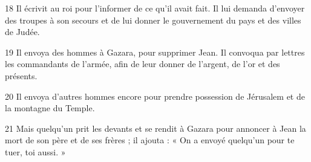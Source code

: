 
18 Il écrivit au roi pour l’informer de ce qu’il avait fait. Il lui demanda d’envoyer des troupes à son secours et de lui donner le gouvernement du pays et des villes de Judée.

19 Il envoya des hommes à Gazara, pour supprimer Jean. Il convoqua par lettres les commandants de l’armée, afin de leur donner de l’argent, de l’or et des présents.

20 Il envoya d’autres hommes encore pour prendre possession de Jérusalem et de la montagne du Temple.

21 Mais quelqu’un prit les devants et se rendit à Gazara pour annoncer à Jean la mort de son père et de ses frères ; il ajouta : « On a envoyé quelqu’un pour te tuer, toi aussi. »
